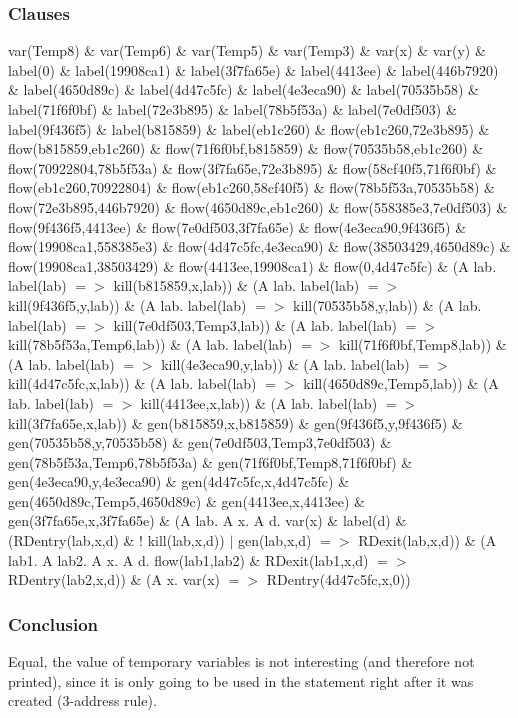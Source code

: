 \subsubsection{Clauses}
var(Temp8) \& var(Temp6) \& var(Temp5) \& var(Temp3) \& var(x) \& var(y) \& 
label(0) \& label(19908ca1) \& label(3f7fa65e) \& label(4413ee) \& label(446b7920) \& label(4650d89c) \& label(4d47c5fc) \& label(4e3eca90) \& label(70535b58) \& label(71f6f0bf) \& label(72e3b895) \& label(78b5f53a) \& label(7e0df503) \& label(9f436f5) \& label(b815859) \& label(eb1c260) \& 
flow(eb1c260,72e3b895) \& flow(b815859,eb1c260) \& flow(71f6f0bf,b815859) \& flow(70535b58,eb1c260) \& flow(70922804,78b5f53a) \& flow(3f7fa65e,72e3b895) \& flow(58cf40f5,71f6f0bf) \& flow(eb1c260,70922804) \& flow(eb1c260,58cf40f5) \& flow(78b5f53a,70535b58) \& flow(72e3b895,446b7920) \& flow(4650d89c,eb1c260) \& flow(558385e3,7e0df503) \& flow(9f436f5,4413ee) \& flow(7e0df503,3f7fa65e) \& flow(4e3eca90,9f436f5) \& flow(19908ca1,558385e3) \& flow(4d47c5fc,4e3eca90) \& flow(38503429,4650d89c) \& flow(19908ca1,38503429) \& flow(4413ee,19908ca1) \& flow(0,4d47c5fc) \& 
(A lab. label(lab) $=>$ kill(b815859,x,lab)) \& (A lab. label(lab) $=>$ kill(9f436f5,y,lab)) \& (A lab. label(lab) $=>$ kill(70535b58,y,lab)) \& (A lab. label(lab) $=>$ kill(7e0df503,Temp3,lab)) \& (A lab. label(lab) $=>$ kill(78b5f53a,Temp6,lab)) \& (A lab. label(lab) $=>$ kill(71f6f0bf,Temp8,lab)) \& (A lab. label(lab) $=>$ kill(4e3eca90,y,lab)) \& (A lab. label(lab) $=>$ kill(4d47c5fc,x,lab)) \& (A lab. label(lab) $=>$ kill(4650d89c,Temp5,lab)) \& (A lab. label(lab) $=>$ kill(4413ee,x,lab)) \& (A lab. label(lab) $=>$ kill(3f7fa65e,x,lab)) \& 
gen(b815859,x,b815859) \& gen(9f436f5,y,9f436f5) \& gen(70535b58,y,70535b58) \& gen(7e0df503,Temp3,7e0df503) \& gen(78b5f53a,Temp6,78b5f53a) \& gen(71f6f0bf,Temp8,71f6f0bf) \& gen(4e3eca90,y,4e3eca90) \& gen(4d47c5fc,x,4d47c5fc) \& gen(4650d89c,Temp5,4650d89c) \& gen(4413ee,x,4413ee) \& gen(3f7fa65e,x,3f7fa65e) \& 
(A lab. A x. A d. var(x) \& label(d) \& (RDentry(lab,x,d) \& ! kill(lab,x,d)) $|$ gen(lab,x,d) $=>$ RDexit(lab,x,d)) \& 
(A lab1. A lab2. A x. A d. flow(lab1,lab2) \& RDexit(lab1,x,d) $=>$ RDentry(lab2,x,d)) \& 
(A x. var(x) $=>$ RDentry(4d47c5fc,x,0))
\subsubsection{Conclusion}
Equal, the value of temporary variables is not interesting (and therefore not printed), since it is only going to be used in the statement right after it was created (3-address rule).

